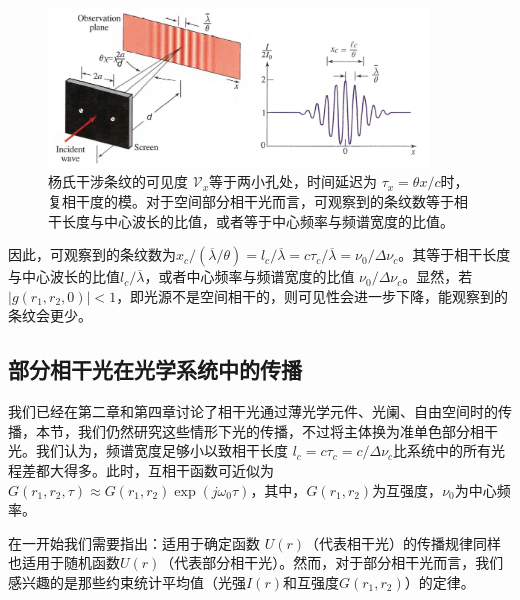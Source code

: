 \documentclass[UTF8]{ctexart}
\numberwithin{figure}{subsection}
\numberwithin{table}{subsection}
\begin{document}
\begin{figure}[H]
\centering
\includegraphics[width=0.9\textwidth]{11_2_6.PNG}
\caption{杨氏干涉条纹的可见度 $\mathcal{V}_x $等于两小孔处，时间延迟为 $\tau_x = \theta x / c$时，复相干度的模。对于空间部分相干光而言，可观察到的条纹数等于相干长度与中心波长的比值，或者等于中心频率与频谱宽度的比值。}
\label{fig: 11_2_6}
\end{figure}
\par 因此，可观察到的条纹数为$x_c / (\overline{\lambda} / \theta) = l_c / \overline{\lambda} = c\tau_c / \overline{\lambda} = \nu_0 / \Delta \nu_c$。其等于相干长度与中心波长的比值$l_c / \overline{\lambda}$，或者中心频率与频谱宽度的比值 $\nu_0 / \Delta \nu_c$。显然，若$\lvert g(r_1, r_2, 0) \rvert < 1$，即光源不是空间相干的，则可见性会进一步下降，能观察到的条纹会更少。

\bigbreak\begingroup
\color{ksc}
\subsection{部分相干光在光学系统中的传播}
\endgroup
我们已经在第二章和第四章讨论了相干光通过薄光学元件、光阑、自由空间时的传播，本节，我们仍然研究这些情形下光的传播，不过将主体换为准单色部分相干光。我们认为，频谱宽度足够小以致相干长度 $l_c = c\tau_c = c / \Delta \nu_c$比系统中的所有光程差都大得多。此时，互相干函数可近似为 $G(r_1, r_2, \tau) \approx G(r_1, r_2) \exp(j\omega_0 \tau)$，其中，$G(r_1, r_2)$为互强度，$\nu_0$为中心频率。
\par 在一开始我们需要指出：适用于确定函数 $U(r)$（代表相干光）的传播规律同样也适用于随机函数$U(r)$（代表部分相干光）。然而，对于部分相干光而言，我们感兴趣的是那些约束统计平均值（光强$I(r)$和互强度$G(r_1, r_2)$）的定律。

\bigbreak\begingroup
\color{ksc}
\end{document}
